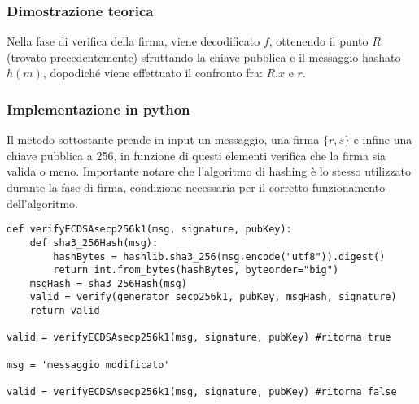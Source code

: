 \subsubsection{Dimostrazione teorica}

Nella fase di verifica della firma, viene decodificato $f$, ottenendo il punto $R$ (trovato precedentemente) sfruttando la chiave pubblica e il messaggio hashato $h(m)$, dopodiché viene effettuato il confronto fra: $R.x$ e $r$. 

\subsubsection{Implementazione in python}

Il metodo sottostante prende in input un messaggio, una firma $\{r, s\}$ e infine una chiave pubblica a 256, in funzione di questi elementi verifica che la firma sia valida o meno. Importante notare che l'algoritmo di hashing è lo stesso utilizzato durante la fase di firma, condizione necessaria per il corretto funzionamento dell'algoritmo.

\begin{lstlisting}
def verifyECDSAsecp256k1(msg, signature, pubKey):
	def sha3_256Hash(msg):
		hashBytes = hashlib.sha3_256(msg.encode("utf8")).digest()
		return int.from_bytes(hashBytes, byteorder="big")
	msgHash = sha3_256Hash(msg)
	valid = verify(generator_secp256k1, pubKey, msgHash, signature)
	return valid
	
valid = verifyECDSAsecp256k1(msg, signature, pubKey) #ritorna true

msg = 'messaggio modificato'

valid = verifyECDSAsecp256k1(msg, signature, pubKey) #ritorna false
\end{lstlisting}

